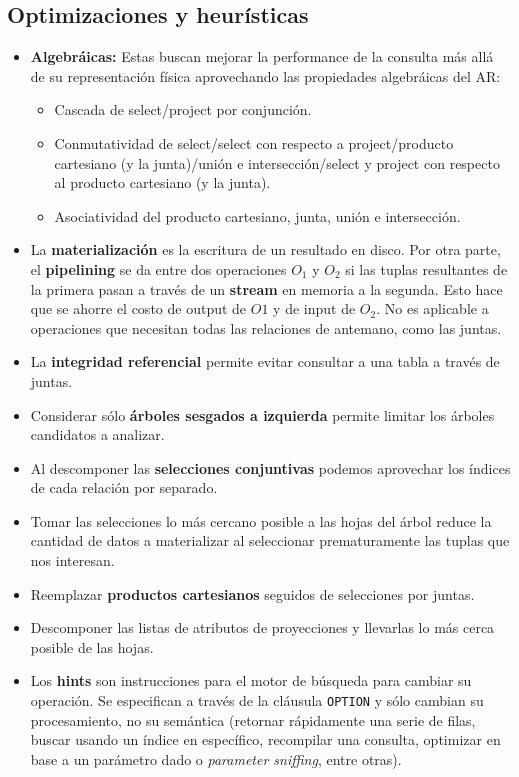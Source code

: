 \subsection*{Optimizaciones y heurísticas}
\begin{itemize}
    \item \textbf{Algebráicas:} Estas buscan mejorar la performance de la consulta más allá de su representación física aprovechando las propiedades algebráicas del AR:
    \begin{itemize}
        \item Cascada de select/project por conjunción.
        \item Conmutatividad de select/select con respecto a project/producto cartesiano (y la junta)/unión e intersección/select y project con respecto al producto cartesiano (y la junta).
        \item Asociatividad del producto cartesiano, junta, unión e intersección.
    \end{itemize}
    \item La \textbf{materialización} es la escritura de un resultado en disco. Por otra parte, el \textbf{pipelining} se da entre dos operaciones $O_1$ y $O_2$ si las tuplas resultantes de la primera pasan a través de un \textbf{stream} en memoria a la segunda. Esto hace que se ahorre el costo de output de $O1$ y de input de $O_2$. No es aplicable a operaciones que necesitan todas las relaciones de antemano, como las juntas.
    \item La \textbf{integridad referencial} permite evitar consultar a una tabla a través de juntas.
    \item Considerar sólo \textbf{árboles sesgados a izquierda} permite limitar los árboles candidatos a analizar.
    \item Al descomponer las \textbf{selecciones conjuntivas} podemos aprovechar los índices de cada relación por separado.
    \item Tomar las selecciones lo más cercano posible a las hojas del árbol reduce la cantidad de datos a materializar al seleccionar prematuramente las tuplas que nos interesan.
    \item Reemplazar \textbf{productos cartesianos} seguidos de selecciones por juntas.
    \item Descomponer las listas de atributos de proyecciones y llevarlas lo más cerca posible de las hojas.
    \item Los \textbf{hints} son instrucciones para el motor de búsqueda para cambiar su operación. Se especifican a través de la cláusula \texttt{OPTION} y sólo cambian su procesamiento, no su semántica (retornar rápidamente una serie de filas, buscar usando un índice en específico, recompilar una consulta, optimizar en base a un parámetro dado o \textit{parameter sniffing}, entre otras).

\end{itemize}
